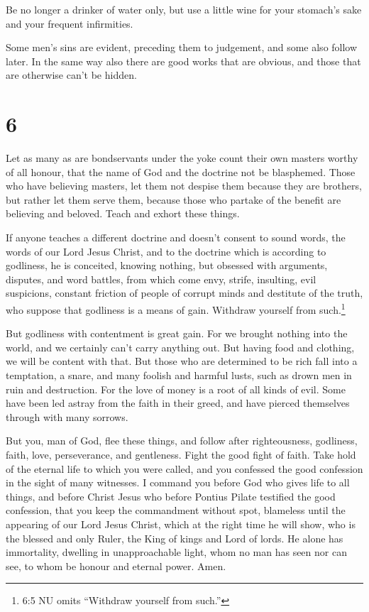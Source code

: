  Be no longer a drinker of water only, but use a little
wine for your stomach's sake and your frequent infirmities.

 Some men's sins are evident, preceding them to judgement,
and some also follow later.  In the same way also there are
good works that are obvious, and those that are otherwise can't be
hidden.

\hypertarget{section-5}{%
\section{6}\label{section-5}}

 Let as many as are bondservants under the yoke count their
own masters worthy of all honour, that the name of God and the doctrine
not be blasphemed.  Those who have believing masters, let
them not despise them because they are brothers, but rather let them
serve them, because those who partake of the benefit are believing and
beloved. Teach and exhort these things.

 If anyone teaches a different doctrine and doesn't consent
to sound words, the words of our Lord Jesus Christ, and to the doctrine
which is according to godliness,  he is conceited, knowing
nothing, but obsessed with arguments, disputes, and word battles, from
which come envy, strife, insulting, evil suspicions, 
constant friction of people of corrupt minds and destitute of the truth,
who suppose that godliness is a means of gain. Withdraw yourself from
such.\footnote{6:5 NU omits ``Withdraw yourself from such.''}

 But godliness with contentment is great gain. 
For we brought nothing into the world, and we certainly can't carry
anything out.  But having food and clothing, we will be
content with that.  But those who are determined to be rich
fall into a temptation, a snare, and many foolish and harmful lusts,
such as drown men in ruin and destruction.  For the love of
money is a root of all kinds of evil. Some have been led astray from the
faith in their greed, and have pierced themselves through with many
sorrows.

 But you, man of God, flee these things, and follow after
righteousness, godliness, faith, love, perseverance, and gentleness.
 Fight the good fight of faith. Take hold of the eternal
life to which you were called, and you confessed the good confession in
the sight of many witnesses.  I command you before God who
gives life to all things, and before Christ Jesus who before Pontius
Pilate testified the good confession,  that you keep the
commandment without spot, blameless until the appearing of our Lord
Jesus Christ,  which at the right time he will show, who is
the blessed and only Ruler, the King of kings and Lord of lords.
 He alone has immortality, dwelling in unapproachable
light, whom no man has seen nor can see, to whom be honour and eternal
power. Amen.

